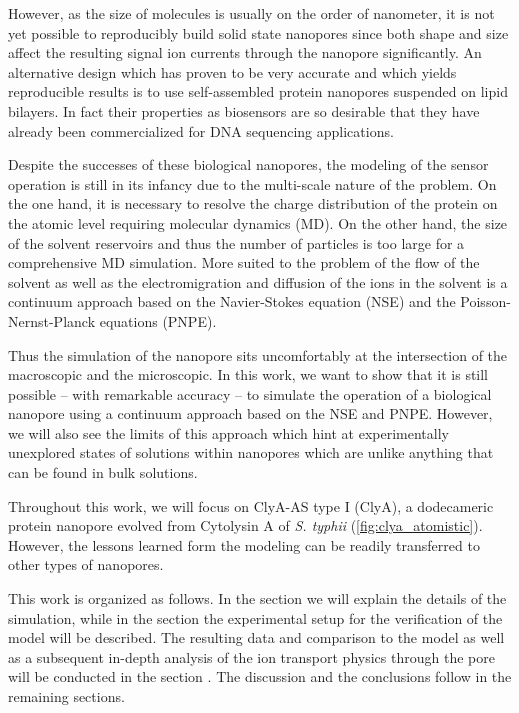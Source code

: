 \documentclass[journal=ancac3, manuscript=article, etalmode=truncate,maxauthors=0]{achemso}
\begin{document}
However, as the size of molecules is usually on the order of nanometer, it is not yet possible to reproducibly
build solid state nanopores\cite{} since both shape and size affect the resulting signal ion currents through
the nanopore significantly. An alternative design which has proven to be very accurate and which yields
reproducible results is to use self-assembled protein nanopores suspended on lipid bilayers.\cite{deam2016}
In fact their properties as biosensors are so desirable that they have already been commercialized for DNA
sequencing applications.\cite{???}

Despite the successes of these biological nanopores, the modeling of the sensor operation is still
in its infancy due to the multi-scale nature of the problem. On the one hand, it is necessary to
resolve the charge distribution of the protein on the atomic level requiring molecular dynamics
(MD).\cite{}  On the other hand, the size of the solvent reservoirs and thus the number of
particles is too large for a comprehensive MD simulation. More suited to the problem of the
flow of the solvent as well as the electromigration and diffusion of the ions in the solvent is a
continuum approach based on the Navier-Stokes equation (NSE) and the Poisson-Nernst-Planck equations
(PNPE).\cite{}

Thus the simulation of the nanopore sits uncomfortably at the intersection of the macroscopic and the
microscopic. In this work, we want to show that it is still possible -- with remarkable accuracy --
to simulate the operation of a biological nanopore using a continuum approach based on the NSE and
PNPE. However, we will also see the limits of this approach which hint at experimentally unexplored states of
solutions within nanopores which are unlike anything that can be found in bulk solutions.

Throughout this work, we will focus on ClyA-AS type I (ClyA), a dodecameric protein nanopore evolved from
Cytolysin A of \textit{S. typhii} (\cref{fig:clya_atomistic}).\cite{soskine2013} However, the lessons learned
form the modeling can be readily transferred to other types of nanopores.

This work is organized as follows. In the section \emph{} we will explain the
details of the simulation, while in the section \emph{} the experimental setup for
the verification of the model will be described. The resulting data and comparison to the model as well as a
subsequent in-depth analysis of the ion transport physics through the pore will be conducted in the section
\emph{}. The discussion and the conclusions follow in the remaining sections.
\end{document}
